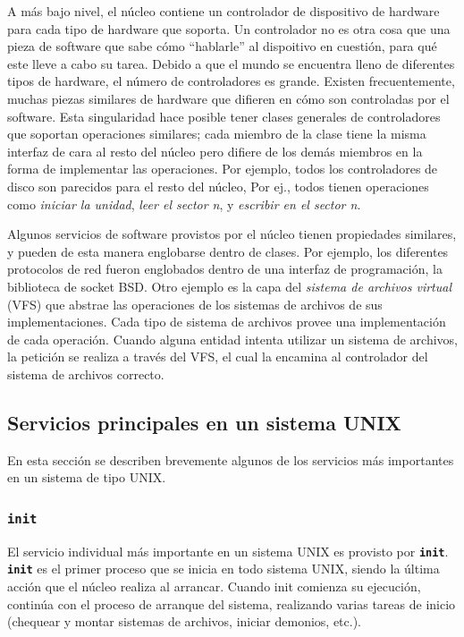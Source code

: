 \documentclass[12pt]{article}
\begin{document}
A más bajo nivel, el núcleo contiene un controlador de dispositivo de
hardware para cada tipo de hardware que soporta. Un controlador no es otra
cosa que una pieza de software que sabe cómo ``hablarle'' al dispoitivo en
cuestión, para qué este lleve a cabo su tarea. Debido a que el mundo se
encuentra lleno de diferentes tipos de hardware, el número de 
controladores es grande. Existen frecuentemente, muchas piezas similares 
de hardware que difieren en cómo son controladas por el software. Esta 
singularidad hace posible tener clases generales de controladores que 
soportan operaciones similares; cada miembro de la clase tiene la misma 
interfaz de cara al resto del núcleo pero difiere de los demás miembros 
en la forma de implementar las operaciones. Por
ejemplo, todos los controladores de disco son parecidos para el resto del
núcleo, Por ej., todos tienen operaciones como \textit{iniciar la unidad},
\textit{leer el sector n}, y \textit{escribir en el sector n}.

Algunos servicios de software provistos por el núcleo tienen propiedades
similares, y pueden de esta manera englobarse dentro de clases. Por 
ejemplo, los diferentes protocolos de red fueron englobados dentro de 
una interfaz de programación, la biblioteca de socket BSD. Otro ejemplo 
es la capa del \textit{sistema de archivos virtual} (VFS) que abstrae 
las operaciones de los sistemas de archivos de sus implementaciones. 
Cada tipo de sistema de archivos provee una implementación de cada 
operación. Cuando alguna entidad intenta utilizar un sistema de archivos,
la petición se realiza a través del VFS, el cual la encamina al 
controlador del sistema de archivos correcto.


\subsection{Servicios principales en un sistema UNIX}

 En esta sección se describen brevemente algunos de los servicios más
importantes en un sistema de tipo UNIX.  

\subsubsection{\texttt{\textbf{init}}}

 El servicio individual más importante en un sistema UNIX es provisto por
\texttt{\textbf{init}}. \texttt{\textbf{init}} es el primer proceso que se
inicia en todo sistema UNIX, siendo la última acción que el núcleo 
realiza al arrancar.  Cuando init comienza su ejecución, continúa con el 
proceso de arranque del sistema, realizando varias tareas de inicio 
(chequear y montar sistemas de archivos, iniciar demonios, etc.).  
\end{document}
